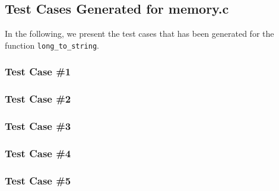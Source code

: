 \newpage
\subsection{Test Cases Generated for memory.c}

In the following, we present the test cases that has been generated for the function \texttt{long\_to\_string}.

\subsubsection{Test Case \#1}


\subsubsection{Test Case \#2}


\subsubsection{Test Case \#3}


\subsubsection{Test Case \#4}


\subsubsection{Test Case \#5}


